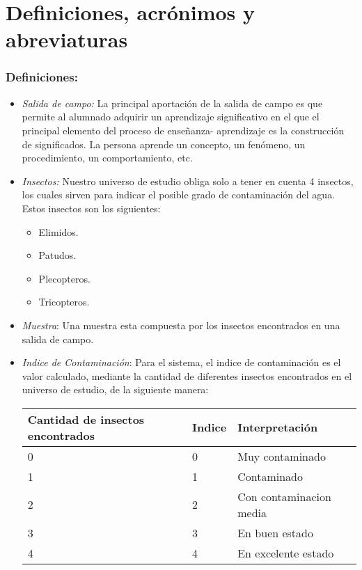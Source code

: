 \section{Definiciones, acrónimos y abreviaturas}

    \subsubsection{Definiciones:}
  
        \begin{itemize}
 
        \item \emph{Salida de campo:} La principal aportación de la salida de campo es que permite al alumnado adquirir un aprendizaje significativo en el que el principal elemento del proceso de enseñanza- aprendizaje es la construcción de significados. La persona aprende un concepto, un fenómeno, un procedimiento, un comportamiento, etc.

        \item \emph{Insectos:} Nuestro universo de estudio obliga solo a tener en cuenta 4 insectos, los cuales sirven para indicar el posible grado de contaminación del agua. Estos insectos son los siguientes:
            \begin{itemize}
                \item Elimidos.
                \item Patudos.
                \item Plecopteros.
                \item Tricopteros.
            \end{itemize}

        \item \emph{Muestra}: Una muestra esta compuesta por los insectos encontrados en una salida de campo. 

        \item \emph{Indice de Contaminación}: Para el sistema, el indice de contaminación es el valor calculado, mediante la cantidad de diferentes insectos encontrados en el universo de estudio, de la siguiente manera:
        \begin{table}[H]
            \centering
            \begin{tabular}{|p{3.8cm}|l|l|}
                \hline
                \centering
                Cantidad de insectos encontrados  & Indice & Interpretación \\ \hline 
                            0                     & 0 & Muy contaminado \\ \hline
                            1                     & 1 & Contaminado \\ \hline
                            2                     & 2 & Con contaminacion media \\ \hline
                            3                     & 3 & En buen estado \\ \hline
                            4                     & 4 & En excelente estado \\ 
                \hline
            \end{tabular}
        \end{table}


\end{itemize}

